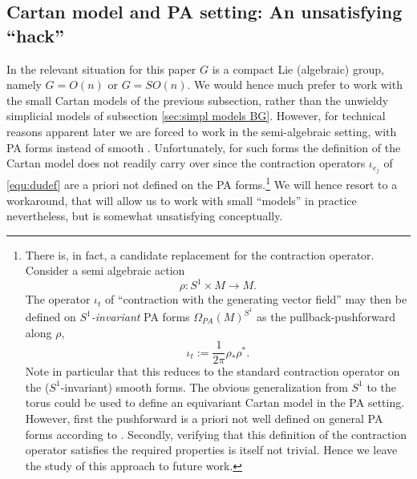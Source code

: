 \documentclass[a4paper]{amsart}
\theoremstyle{plain}
\theoremstyle{definition}
\newcommand{\SO}{\mathit{SO}}
\begin{document}
\subsection{Cartan model and PA setting: An unsatisfying ``hack''}\label{sec:PA Cartan model}
In the relevant situation for this paper $G$ is a compact Lie (algebraic) group, namely $G=O(n)$ or $G=\SO(n)$.
We would hence much prefer to work with the small Cartan models of the previous subsection, rather than the unwieldy simplicial models of subsection \ref{sec:simpl models BG}.
However, for technical reasons apparent later we are forced to work in the semi-algebraic setting, with PA forms instead of smooth \cite{HLTV}.
Unfortunately, for such forms the definition of the Cartan model does not readily carry over since the contraction operators $\iota_{e_j}$ of \eqref{equ:dudef} are a priori not defined on the PA forms.\footnote{There is, in fact, a candidate replacement for the contraction operator. 
Consider a semi algebraic action 
\[
\rho: S^1\times M\to M.
\]
The operator $\iota_{t}$ of ``contraction with the generating vector field'' may then be defined on \emph{$S^1$-invariant} PA forms $\Omega_{PA}(M)^{S^1}$ as the pullback-pushforward along $\rho$,
\[
\iota_t := \frac 1 {2\pi} \rho_* \rho^*.
\]  
Note in particular that this reduces to the standard contraction operator on the ($S^1$-invariant) smooth forms. The obvious generalization from $S^1$ to the torus could be used to define an equivariant Cartan model in the PA setting. 
However, first the pushforward is a priori not well defined on general PA forms according to \cite{HLTV}.
Secondly, verifying that this definition of the contraction operator satisfies the required properties is itself not trivial. Hence we leave the study of this approach to future work. }
We will hence resort to a workaround, that will allow us to work with small ``models'' in practice nevertheless, but is somewhat unsatisfying conceptually.
\end{document}
